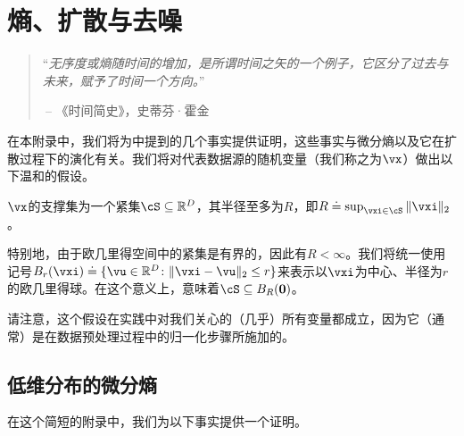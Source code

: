 \documentclass[../../book-main_zh.tex]{subfiles}
\begin{document}
\chapter{熵、扩散与去噪}\label{app:entropy}\label{app:diffusion-denoising}

\begin{quote}
``{\em 无序度或熵随时间的增加，是所谓时间之矢的一个例子，它区分了过去与未来，赋予了时间一个方向。}''

$~$\hfill -- 《时间简史》，史蒂芬·霍金
 \end{quote}
\vspace{5mm}

在本附录中，我们将为中提到的几个事实提供证明，这些事实与微分熵以及它在扩散过程下的演化有关。我们将对代表数据源的随机变量（我们称之为\(\vx\)）做出以下温和的假设。

\begin{assumption}\label{assumption:entropy_x_compact_support}
    \(\vx\)的支撑集为一个紧集\(\cS \subseteq \R^{D}\)，其半径至多为\(R\)，即\(R \doteq \sup_{\vxi \in \cS}\norm{\vxi}_{2}\)。
\end{assumption}

特别地，由于欧几里得空间中的紧集是有界的，因此有\(R < \infty\)。我们将统一使用记号\(B_{r}(\vxi) \doteq \{\vu \in \R^{D} \colon \norm{\vxi - \vu}_{2} \leq r\}\)来表示以\(\vxi\)为中心、半径为\(r\)的欧几里得球。在这个意义上，意味着\(\cS \subseteq B_{R}(\vzero)\)。

请注意，这个假设在实践中对我们关心的（几乎）所有变量都成立，因为它（通常）是在数据预处理过程中的归一化步骤所施加的。

\section{低维分布的微分熵}\label{sec:low_dim_entropy}

在这个简短的附录中，我们为以下事实提供一个证明。
\end{document}
